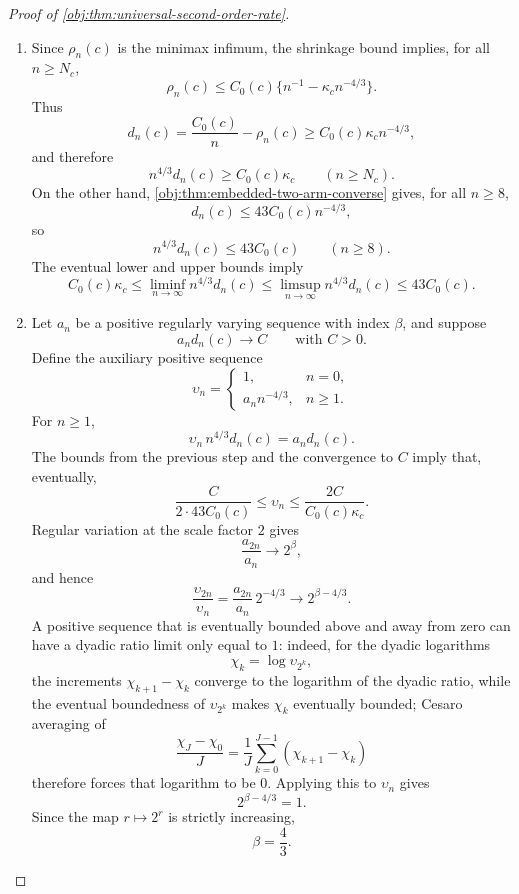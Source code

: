 \begin{proof}[Proof of \cref{obj:thm:universal-second-order-rate}]
\begin{enumerate}
If \(|\Theta_n(z)|>b_n/2\), then the lower bound on \(Q_n(z)\) yields
\[
\frac{Q_n(z)}{n^2}\ge \frac{\lambda_c}{2}n^{-4/3}.
\]
Using \(\mathcal C_n(z)\ge 0\) and the same identity for \(\varepsilon_n^2b_n^2\),
\[
\mathbb E\!\left[\{X_n-\varepsilon_n g_n(X_n)-\Theta_n(z)\}^2\mid z\right]
\le
\frac1n-\frac{7\lambda_c}{16}n^{-4/3}
\le
\frac1n-\kappa_c n^{-4/3}.
\]
The two cases cover every schedule. Multiplying by \((L_c/2)^2=C_0(c)\) gives, uniformly in \(z\),
\[
R_n(\mathcal D^\star,\widehat\tau_n^{\mathrm{sh}};z)
\le
C_0(c)\{n^{-1}-\kappa_c n^{-4/3}\}.
\]
Taking the supremum over schedules proves the asserted clipped-shrinkage risk bound for all \(n\ge N_c\).

\item Since \(\rho_n(c)\) is the minimax infimum, the shrinkage bound implies, for all \(n\ge N_c\),
\[
\rho_n(c)
\le
C_0(c)\{n^{-1}-\kappa_c n^{-4/3}\}.
\]
Thus
\[
d_n(c)=\frac{C_0(c)}n-\rho_n(c)
\ge
C_0(c)\kappa_c n^{-4/3},
\]
and therefore
\[
n^{4/3}d_n(c)\ge C_0(c)\kappa_c
\qquad(n\ge N_c).
\]
On the other hand, \cref{obj:thm:embedded-two-arm-converse} gives, for all \(n\ge 8\),
\[
d_n(c)\le 43C_0(c)n^{-4/3},
\]
so
\[
n^{4/3}d_n(c)\le 43C_0(c)
\qquad(n\ge 8).
\]
The eventual lower and upper bounds imply
\[
C_0(c)\kappa_c
\le
\liminf_{n\to\infty} n^{4/3}d_n(c)
\le
\limsup_{n\to\infty} n^{4/3}d_n(c)
\le
43C_0(c).
\]

\item Let \(a_n\) be a positive regularly varying sequence with index \(\beta\), and suppose
\[
a_n d_n(c)\longrightarrow C
\qquad\text{with }C>0.
\]
Define the auxiliary positive sequence
\[
\upsilon_n=
\begin{cases}
1,& n=0,\\
a_n n^{-4/3},& n\ge 1.
\end{cases}
\]
For \(n\ge1\),
\[
\upsilon_n\, n^{4/3}d_n(c)=a_nd_n(c).
\]
The bounds from the previous step and the convergence to \(C\) imply that, eventually,
\[
\frac{C}{2\cdot 43C_0(c)}
\le
\upsilon_n
\le
\frac{2C}{C_0(c)\kappa_c}.
\]
Regular variation at the scale factor \(2\) gives
\[
\frac{a_{2n}}{a_n}\longrightarrow 2^\beta,
\]
and hence
\[
\frac{\upsilon_{2n}}{\upsilon_n}
=
\frac{a_{2n}}{a_n}\,2^{-4/3}
\longrightarrow
2^{\beta-4/3}.
\]
A positive sequence that is eventually bounded above and away from zero can have a dyadic ratio limit only equal to \(1\): indeed, for the dyadic logarithms
\[
\chi_k=\log \upsilon_{2^k},
\]
the increments \(\chi_{k+1}-\chi_k\) converge to the logarithm of the dyadic ratio, while the eventual boundedness of \(\upsilon_{2^k}\) makes \(\chi_k\) eventually bounded; Cesaro averaging of
\[
\frac{\chi_J-\chi_0}{J}
=
\frac1J\sum_{k=0}^{J-1}(\chi_{k+1}-\chi_k)
\]
therefore forces that logarithm to be \(0\). Applying this to \(\upsilon_n\) gives
\[
2^{\beta-4/3}=1.
\]
Since the map \(r\mapsto 2^r\) is strictly increasing,
\[
\beta=\frac43 .
\]
\end{enumerate}
\end{proof}

